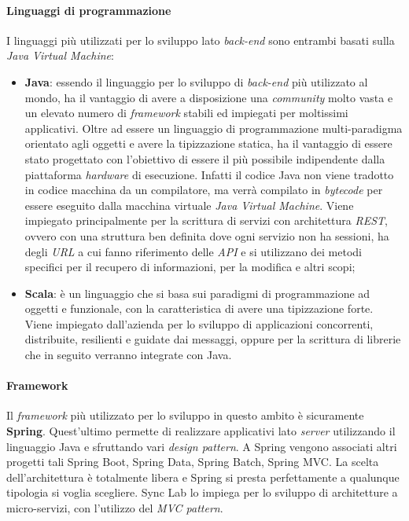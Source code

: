 \paragraph{Linguaggi di programmazione}
I linguaggi più utilizzati per lo sviluppo lato \textit{back-end} sono entrambi basati sulla \textit{Java Virtual Machine}:
\begin{itemize}
  \item \textbf{Java}: essendo il linguaggio per lo sviluppo di \textit{back-end} più utilizzato al mondo, ha il vantaggio di avere a disposizione una \textit{community} molto vasta e un elevato numero di \textit{framework} stabili ed impiegati per moltissimi applicativi. Oltre ad essere un linguaggio di programmazione multi-paradigma orientato agli oggetti e avere la tipizzazione statica, ha il vantaggio di essere stato progettato con l'obiettivo di essere il più possibile indipendente dalla piattaforma \textit{hardware} di esecuzione. Infatti il codice Java non viene tradotto in codice macchina da un compilatore, ma verrà compilato in \textit{bytecode} per essere eseguito dalla macchina virtuale \textit{Java Virtual Machine}. Viene impiegato principalmente per la scrittura di servizi con architettura \textit{REST}, ovvero con una struttura ben definita dove ogni servizio non ha sessioni, ha degli \textit{URL} a cui fanno riferimento delle \textit{API} e si utilizzano dei metodi specifici per il recupero di informazioni, per la modifica e altri scopi;
  
  \item \textbf{Scala}: è un linguaggio che si basa sui paradigmi di programmazione ad oggetti e funzionale, con la caratteristica di avere una tipizzazione forte. Viene impiegato dall'azienda per lo sviluppo di applicazioni concorrenti, distribuite, resilienti e guidate dai messaggi, oppure per la scrittura di librerie che in seguito verranno integrate con Java.
\end{itemize}

\paragraph{Framework} Il \textit{framework} più utilizzato per lo sviluppo in questo ambito è sicuramente \textbf{Spring}. Quest'ultimo permette di realizzare applicativi lato \textit{server} utilizzando il linguaggio Java e sfruttando vari \textit{design pattern}. A Spring vengono associati altri progetti tali Spring Boot, Spring Data, Spring Batch, Spring MVC. La scelta dell'architettura è totalmente libera e Spring si presta perfettamente a qualunque tipologia si voglia scegliere. 
Sync Lab lo impiega per lo sviluppo di architetture a micro-servizi, con l'utilizzo del \textit{MVC pattern}.